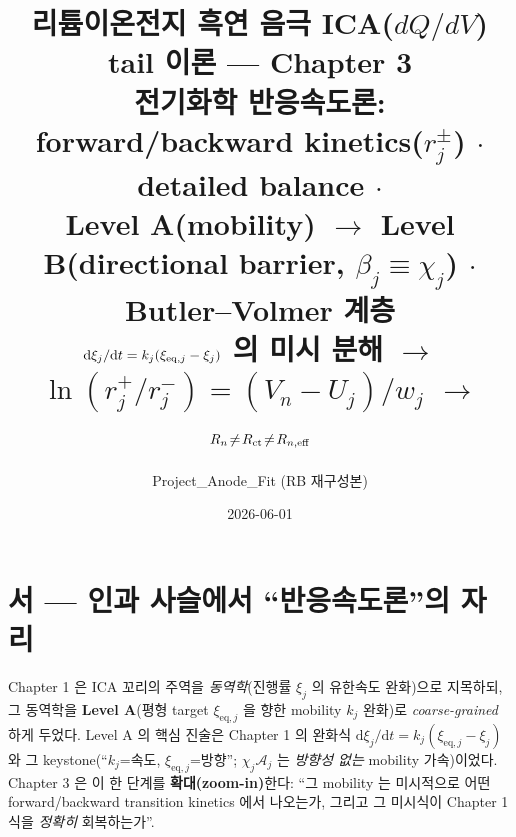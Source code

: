 \documentclass[11pt,a4paper]{article}
\title{\textbf{리튬이온전지 흑연 음극 ICA($dQ/dV$) tail 이론 — Chapter 3}\\[0.4em]
\large 전기화학 반응속도론: forward/backward kinetics($r_j^\pm$) $\cdot$ detailed balance $\cdot$\\
Level A(mobility) $\to$ Level B(directional barrier, $\beta_j\equiv\chi_j$) $\cdot$ Butler--Volmer 계층\\[0.2em]
\normalsize $\dd\xi_j/\dd t=k_j(\xi_{\eq,j}-\xi_j)$ 의 미시 분해 $\to$ $\ln(r_j^+/r_j^-)=(V_n-U_j)/w_j$ $\to$ $R_n\!\ne\!R_{\mathrm{ct}}\!\ne\!R_{n,\mathrm{eff}}$}
\author{Project\_Anode\_Fit (RB 재구성본)}
\date{2026-06-01}
\newcommand{\dd}{\mathrm{d}}
\newcommand{\eq}{\mathrm{eq}}
\begin{document}
\sloppy
\maketitle

\section*{서 — 인과 사슬에서 ``반응속도론''의 자리}
Chapter 1 은 ICA 꼬리의 주역을 \emph{동역학}(진행률 $\xi_j$ 의 유한속도 완화)으로 지목하되, 그 동역학을
\textbf{Level A}(평형 target $\xi_{\eq,j}$ 을 향한 mobility $k_j$ 완화)로 \emph{coarse-grained} 하게 두었다.
Level A 의 핵심 진술은 Chapter 1 의 완화식 $\dd\xi_j/\dd t=k_j(\xi_{\eq,j}-\xi_j)$ 와 그 keystone(``$k_j$=속도,
$\xi_{\eq,j}$=방향''; $\chi_j\mathcal A_j$ 는 \emph{방향성 없는} mobility 가속)이었다. Chapter 3 은 이 한 단계를
\textbf{확대(zoom-in)}한다: ``그 mobility 는 미시적으로 어떤 forward/backward transition kinetics 에서
나오는가, 그리고 그 미시식이 Chapter 1 식을 \emph{정확히} 회복하는가''.
\end{document}
